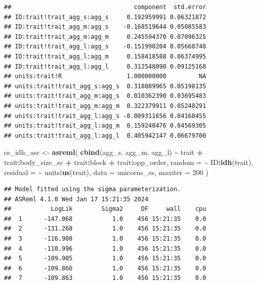 \documentclass[
  12pt,
]{book}
\newenvironment{Shaded}{\begin{snugshade}}{\end{snugshade}}
\newcommand{\DataTypeTok}[1]{\textcolor[rgb]{0.13,0.29,0.53}{#1}}
\newcommand{\DecValTok}[1]{\textcolor[rgb]{0.00,0.00,0.81}{#1}}
\newcommand{\KeywordTok}[1]{\textcolor[rgb]{0.13,0.29,0.53}{\textbf{#1}}}
\newcommand{\NormalTok}[1]{#1}
\newcommand{\OperatorTok}[1]{\textcolor[rgb]{0.81,0.36,0.00}{\textbf{#1}}}
\newcommand{\StringTok}[1]{\textcolor[rgb]{0.31,0.60,0.02}{#1}}
\begin{document}
\begin{Shaded}
\end{Shaded}

\begin{verbatim}
##                                  component  std.error
## ID:trait!trait_agg_s:agg_s     0.192959991 0.06321872
## ID:trait!trait_agg_m:agg_s    -0.168519644 0.05085583
## ID:trait!trait_agg_m:agg_m     0.245594370 0.07096325
## ID:trait!trait_agg_l:agg_s    -0.151990204 0.05660748
## ID:trait!trait_agg_l:agg_m     0.158418588 0.06374995
## ID:trait!trait_agg_l:agg_l     0.312548090 0.09125168
## units:trait!R                  1.000000000         NA
## units:trait!trait_agg_s:agg_s  0.318089965 0.05198135
## units:trait!trait_agg_m:agg_s  0.010362390 0.03695483
## units:trait!trait_agg_m:agg_m  0.322379911 0.05248291
## units:trait!trait_agg_l:agg_s -0.009311656 0.04168455
## units:trait!trait_agg_l:agg_m  0.159240476 0.04569305
## units:trait!trait_agg_l:agg_l  0.405942147 0.06679700
\end{verbatim}

\begin{Shaded}
\begin{Highlighting}[]
\NormalTok{cs\_idh\_asr \textless{}{-}}\StringTok{ }\KeywordTok{asreml}\NormalTok{(}
  \KeywordTok{cbind}\NormalTok{(agg\_s, agg\_m, agg\_l) }\OperatorTok{\textasciitilde{}}\StringTok{ }\NormalTok{trait }\OperatorTok{+}\StringTok{ }\NormalTok{trait}\OperatorTok{:}\NormalTok{body\_size\_sc }\OperatorTok{+}
\StringTok{    }\NormalTok{trait}\OperatorTok{:}\NormalTok{block }\OperatorTok{+}
\StringTok{    }\NormalTok{trait}\OperatorTok{:}\NormalTok{opp\_order,}
  \DataTypeTok{random =} \OperatorTok{\textasciitilde{}}\StringTok{ }\NormalTok{ID}\OperatorTok{:}\KeywordTok{idh}\NormalTok{(trait),}
  \DataTypeTok{residual =} \OperatorTok{\textasciitilde{}}\StringTok{ }\NormalTok{units}\OperatorTok{:}\KeywordTok{us}\NormalTok{(trait),}
  \DataTypeTok{data =}\NormalTok{ unicorns\_cs,}
  \DataTypeTok{maxiter =} \DecValTok{200}
\NormalTok{)}
\end{Highlighting}
\end{Shaded}

\begin{verbatim}
## Model fitted using the sigma parameterization.
## ASReml 4.1.0 Wed Jan 17 15:21:35 2024
##           LogLik        Sigma2     DF     wall    cpu
##  1      -147.068           1.0    456 15:21:35    0.0
##  2      -131.268           1.0    456 15:21:35    0.0
##  3      -116.908           1.0    456 15:21:35    0.0
##  4      -110.996           1.0    456 15:21:35    0.0
##  5      -109.905           1.0    456 15:21:35    0.0
##  6      -109.866           1.0    456 15:21:35    0.0
##  7      -109.863           1.0    456 15:21:35    0.0
\end{verbatim}
\end{document}
